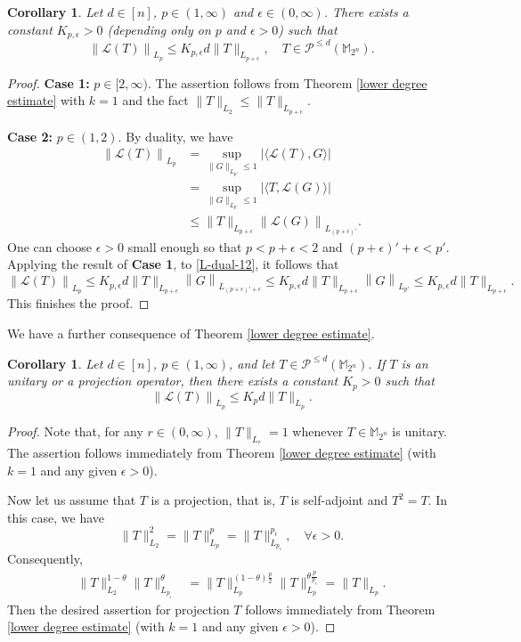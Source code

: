 \documentclass{amsbook}
\newtheorem{corollary}[theorem]{Corollary}
\theoremstyle{definition}
\theoremstyle{remark}
\numberwithin{section}{chapter}
\numberwithin{equation}{chapter}
\newcommand{\M}{\mathbb{M}}
\newcommand{\1}{\mathbf{1}}
\begin{document}
\begin{corollary}\label{BM-d-p+e}
Let $d\in [n]$, $p\in(1,\infty)$ and $\epsilon\in (0,\infty)$. 
There exists a constant $K_{p,\epsilon}>0$ (depending only on $p$ and $\epsilon>0$) such that
$$
\left\|\mathcal{L}(T)\right\|_{L_p}\leq K_{p,\epsilon}d\|T\|_{L_{p+\epsilon}},\quad T\in \mathcal{P}^{\leq d}(\mathbb{M}_{2^n}).
$$
\end{corollary}
\begin{proof} {\bf Case 1:}  $p\in [2,\infty)$. The assertion follows from  
 Theorem \ref{lower degree estimate} with $k=1$ and the fact $\|T\|_{L_2}\leq \|T\|_{L_{p+\epsilon}}$. 

{\bf Case 2:}  $p\in(1,2)$. By duality,  we have
\begin{equation}\label{L-dual-12}
\begin{split}
\left\|\mathcal{L}(T)\right\|_{L_p}&=\sup_{\|G\|_{L_{p'}}\leq1} | \langle\mathcal{L}(T),G\rangle|\\
&=\sup_{\|G\|_{L_{p'}}\leq1} |\langle T,\mathcal{L}(G)\rangle |\\
&\leq \|T\|_{L_{p+\epsilon}}\left\|\mathcal{L}(G)\right\|_{L_{(p+\epsilon)'}}.
\end{split}
\end{equation}
One can choose $\epsilon>0$ small enough so that $p<p+\epsilon<2$ and $(p+\epsilon)'+\epsilon <p'$. Applying the result of {\bf Case 1}, to \eqref{L-dual-12}, it follows that
$$\left\|\mathcal{L}(T)\right\|_{L_p}\leq K_{p,\epsilon} d\|T\|_{L_{p+\epsilon}}\left\|G\right\|_{L_{(p+\epsilon)'+\epsilon}}\leq K_{p,\epsilon} d \|T\|_{L_{p+\epsilon}}\left\|G\right\|_{L_{p'}}\leq K_{p,\epsilon} d \|T\|_{L_{p+\epsilon}}.$$
This finishes the proof.
\end{proof}

We have a further consequence of Theorem \ref{lower degree estimate}. 

\begin{corollary}
Let $d\in [n]$, $p\in(1,\infty)$, and let $T\in \mathcal{P}^{\leq d}(\mathbb{M}_{2^n})$. 
If $T$ is an unitary or a projection operator, then there exists a constant $K_{p}>0$  such that
$$
\left\|\mathcal{L}(T)\right\|_{L_p}\leq K_{p}d\|T\|_{L_p}.
$$
\end{corollary}
\begin{proof}
Note that, for any $r\in (0,\infty)$, $\|T\|_{L_r}=1$ whenever $T\in \M_{2^n}$ is unitary. The assertion follows immediately from Theorem \ref{lower degree estimate} (with $k=1$ and any given $\epsilon>0$). 

Now let us assume that $T$ is a projection, that is, $T$ is self-adjoint and $T^2=T$. In this case, we have
$$\|T\|_{L_2}^2=\|T\|_{L_p}^p=\|T\|_{L_{p_\epsilon}}^{p_\epsilon},\quad \forall \epsilon>0.$$
Consequently,
\begin{align*}
\|T\|^{1-\theta}_{L_2}\|T\|^{\theta}_{L_{p_{\epsilon}}}&=\|T\|^{(1-\theta)\frac{p}{2}}_{L_p}\|T\|^{\theta\frac{p}{p_{\epsilon}}}_{L_p}=\|T\|_{L_p}.
\end{align*}
Then the desired assertion for projection $T$ follows immediately from Theorem \ref{lower degree estimate} (with $k=1$ and any given $\epsilon>0$). 
\end{proof}
\end{document}
